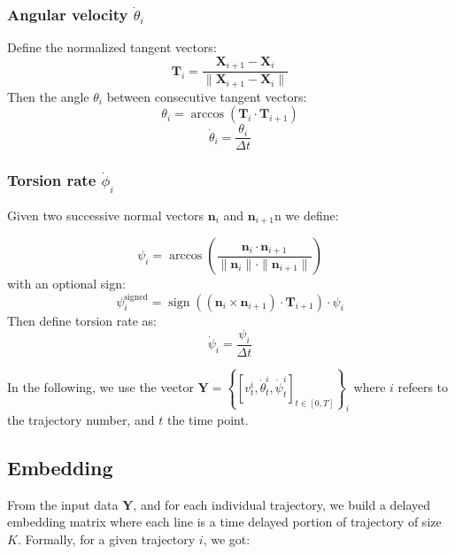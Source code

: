 \subsubsection*{Angular velocity $\dot{\theta}_i$}
Define the normalized tangent vectors:
\begin{equation}
\mathbf{T}_i = \frac{\mathbf{X}_{i+1} - \mathbf{X}_i}{\|\mathbf{X}_{i+1} - \mathbf{X}_i\|}
\end{equation}
Then the angle $\theta_i$ between consecutive tangent vectors:
\begin{equation}
\theta_i = \arccos\left( \mathbf{T}_i \cdot \mathbf{T}_{i+1} \right)
\end{equation}
\begin{equation}
\dot{\theta}_i = \frac{\theta_i}{\Delta t}
\end{equation}
\subsubsection*{Torsion rate $\dot{\phi}_i$}

Given two successive normal vectors $\mathbf{n}_i$ and $\mathbf{n}_{i+1}$n we define:

\begin{equation}
\psi_i = \arccos\left( \frac{ \mathbf{n}_i \cdot \mathbf{n}_{i+1} }{ \|\mathbf{n}_i\| \cdot \|\mathbf{n}_{i+1}\| } \right)
\end{equation}
with an optional sign:
\begin{equation}
\psi_i^\text{signed} = \operatorname{sign}\left( (\mathbf{n}_i \times \mathbf{n}_{i+1}) \cdot \mathbf{T}_{i+1} \right) \cdot \psi_i
\end{equation}
Then define torsion rate as:
\begin{equation}
\dot{\psi}_i = \frac{\psi_i}{\Delta t}
\end{equation}

In the following, we use the vector $\textbf{Y} = \left\{ \left[v_t^i,\dot{\theta}_t^i, \dot{\psi}_t^i \right]_{t\in [0,T]}\right\}_i$ where $i$ refeers to the trajectory number, and $t$ the time point.

\subsection{Embedding}

From the input data $\textbf{Y}$, and for each individual trajectory, we build a delayed embedding matrix where each line is a time delayed portion of trajectory of size $K$. Formally, for a given trajectory $i$, we got: 

